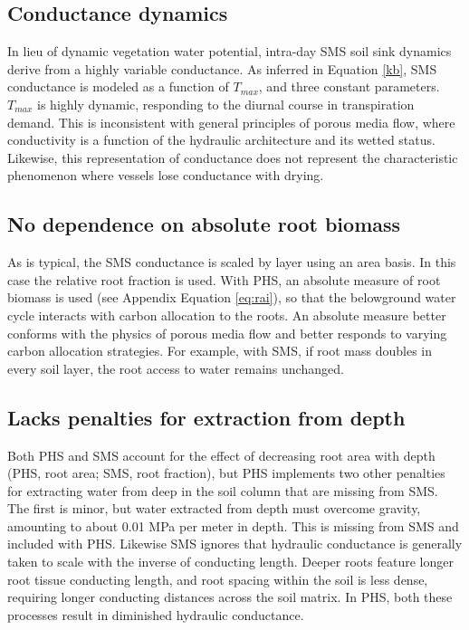 \documentclass[draft,linenumbers]{agujournal}
\begin{document}
    \subsection{Conductance dynamics}
    In lieu of dynamic vegetation water potential, intra-day SMS soil sink dynamics derive from a highly variable conductance.
    As inferred in Equation \ref{kb}, SMS conductance is modeled as a function of $T_{max}$, and three constant parameters.
    $T_{max}$ is highly dynamic, responding to the diurnal course in transpiration demand.
    This is inconsistent with general principles of porous media flow, where conductivity is a function of the hydraulic architecture and its wetted status.
    Likewise, this representation of conductance does not represent the characteristic phenomenon where vessels lose conductance with drying.
      
    \subsection{No dependence on absolute root biomass}
    As is typical, the SMS conductance is scaled by layer using an area basis.
    In this case the relative root fraction is used.
    With PHS, an absolute measure of root biomass is used (see Appendix Equation \ref{eq:rai}), so that the belowground water cycle interacts with carbon allocation to the roots.
    An absolute measure better conforms with the physics of porous media flow and better responds to varying carbon allocation strategies.
    For example, with SMS, if root mass doubles in every soil layer, the root access to water remains unchanged.

    \subsection{Lacks penalties for extraction from depth}
    Both PHS and SMS account for the effect of decreasing root area with depth (PHS, root area; SMS, root fraction), but
    PHS implements two other penalties for extracting water from deep in the soil column that are missing from SMS.
    The first is minor, but water extracted from depth must overcome gravity, amounting to about 0.01 MPa per meter in depth. 
    This is missing from SMS and included with PHS. 
    Likewise SMS ignores that hydraulic conductance is generally taken to scale with the inverse of conducting length.
    Deeper roots feature longer root tissue conducting length, and root spacing within the soil is less dense, requiring longer conducting distances across the soil matrix.
    In PHS, both these processes result in diminished hydraulic conductance.
\end{document}
